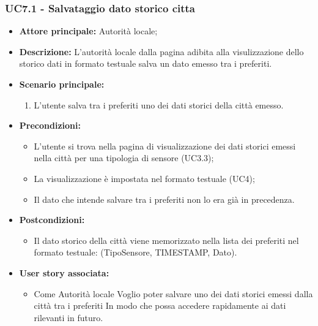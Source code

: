 \subsubsection{UC7.1 - Salvataggio dato storico citta}
\begin{itemize}
    \item \textbf{Attore principale:} Autorità locale;
    \item \textbf{Descrizione:} L’autorità locale dalla pagina adibita alla visulizzazione dello storico dati in formato testuale salva un dato emesso tra i preferiti.
    \item \textbf{Scenario principale:}
          \begin{enumerate}
              \item L'utente salva tra i preferiti uno dei dati storici della città emesso.
          \end{enumerate}
    \item \textbf{Precondizioni:}
          \begin{itemize}
              \item  L'utente si trova nella pagina di visualizzazione  dei dati storici emessi nella città per una tipologia di sensore (UC3.3);
              \item La visualizzazione è impostata nel formato testuale (UC4);
              \item  Il dato che intende salvare tra i preferiti non lo era già in precedenza.
          \end{itemize}
    \item \textbf{Postcondizioni:}
          \begin{itemize}
              \item  Il dato storico della città viene memorizzato nella lista dei preferiti nel
                    formato testuale: (TipoSensore,
                    TIMESTAMP, Dato).
          \end{itemize}
    \item \textbf{User story associata:}
          \begin{itemize}
              \item Come Autorità locale
                    Voglio poter salvare uno dei dati storici emessi dalla città tra i preferiti
                    In modo che possa accedere rapidamente ai dati rilevanti in futuro.
          \end{itemize}
\end{itemize}